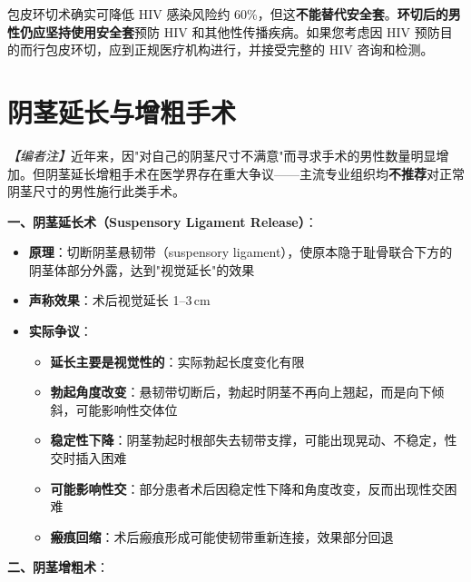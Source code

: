 \documentclass[12pt,a4paper,twoside]{ctexbook}
\begin{document}
\begin{tcolorbox}[colback=pink!5!white,colframe=red!50!black,title=贴心小叮咛]
包皮环切术确实可降低 HIV 感染风险约 60\%，但这\textbf{不能替代安全套}。\textbf{环切后的男性仍应坚持使用安全套}预防 HIV 和其他性传播疾病。如果您考虑因 HIV 预防目的而行包皮环切，应到正规医疗机构进行，并接受完整的 HIV 咨询和检测。
\end{tcolorbox}


\section{阴茎延长与增粗手术}

\label{subsec:penile_enlargement}

\noindent\textit{【编者注】}近年来，因"对自己的阴茎尺寸不满意"而寻求手术的男性数量明显增加。但阴茎延长增粗手术在医学界存在重大争议——主流专业组织均\textbf{不推荐}对正常阴茎尺寸的男性施行此类手术。

\vspace{0.5em}
\noindent\textbf{一、阴茎延长术（Suspensory Ligament Release）}：

\begin{itemize}[leftmargin=2cm]
	\item \textbf{原理}：切断阴茎悬韧带（suspensory ligament），使原本隐于耻骨联合下方的阴茎体部分外露，达到"视觉延长"的效果
	\item \textbf{声称效果}：术后视觉延长 1--3\,cm
	\item \textbf{实际争议}：
	\begin{itemize}
		\item \textbf{延长主要是视觉性的}：实际勃起长度变化有限
		\item \textbf{勃起角度改变}：悬韧带切断后，勃起时阴茎不再向上翘起，而是向下倾斜，可能影响性交体位
		\item \textbf{稳定性下降}：阴茎勃起时根部失去韧带支撑，可能出现晃动、不稳定，性交时插入困难
		\item \textbf{可能影响性交}：部分患者术后因稳定性下降和角度改变，反而出现性交困难
		\item \textbf{瘢痕回缩}：术后瘢痕形成可能使韧带重新连接，效果部分回退
	\end{itemize}
\end{itemize}

\vspace{0.5em}
\noindent\textbf{二、阴茎增粗术}：
\end{document}
